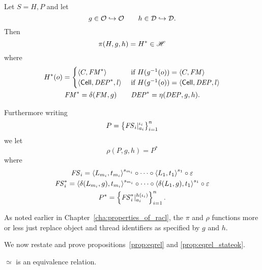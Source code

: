 \begin{definition} \label{def:pirho}
  Let $S = H, P$ and let 
  \begin{equation*}
    g \in \mathcal{O} \hookrightarrow \mathcal{O} \quad\quad h \in \mathcal{D} \hookrightarrow \mathcal{D} .
  \end{equation*}
  Then 
  \begin{equation}
    \pi(H, g, h) = H^* \in \mathscr{H}
  \end{equation}
  where
  \begin{equation}
    \begin{gathered}
      H^*(o) =
      \begin{cases}
        \mbox{$\langle C, \mathit{FM}^* \rangle$}   & \text{ if } H(g^{-1}(o)) = \mbox{$\langle C, \mathit{FM} \rangle$} \\
        \mbox{$\langle \mbox{$\mathsf{Cell}$}{}, \mathit{DEP}^*, l \rangle$} & \text{ if } H(g^{-1}(o)) = \mbox{$\langle \mbox{$\mathsf{Cell}$}{}, \mathit{DEP}, l \rangle$}
      \end{cases} \\
      \mathit{FM}^* = \delta(\mathit{FM}, g) \quad\quad \mathit{DEP}^* = \eta(\mathit{DEP}, g, h).
    \end{gathered}
  \end{equation}

  Furthermore writing
  \begin{equation}
    P = \left\{ \mathit{FS}_i|_{a_i}^{\iota_i} \right\}_{i = 1}^n
  \end{equation}
  we let
  \begin{equation*}
    \rho(P, g, h) = P^*
  \end{equation*}
  where
  \begin{equation*}
    \begin{gathered}
      \mathit{FS}_i = \mbox{$\langle L_{m_i}, t_{m_i} \rangle$}^{s_{m_i}} \circ \dots \circ \mbox{$\langle L_1,
      t_1 \rangle$}^{s_1} \circ \varepsilon \\
      \mathit{FS}_i^* = \mbox{$\langle \delta(L_{m_i}, g), t_{m_i} \rangle$}^{s_{m_i}} \circ \dots \circ
      \mbox{$\langle \delta(L_1,g), t_1 \rangle$}^{s_1} \circ \varepsilon \\
      P^* = \left\{ \mathit{FS}_i^*|_{a_i}^{h(\iota_i)} \right\}_{i = 1}^n.
    \end{gathered}
  \end{equation*}
\end{definition}

\begin{remark}
  As noted earlier in Chapter~\ref{cha:properties_of_racl}, the $\pi$ and $\rho$
  functions more or less just replace object and thread identifiers as
  specified by $g$ and $h$.
\end{remark}

We now restate and prove propositions~\ref{prop:eqrel} and
\ref{prop:eqrel_stateok}.
\begin{proposition*}
  $\simeq$ is an equivalence relation.
\end{proposition*}


